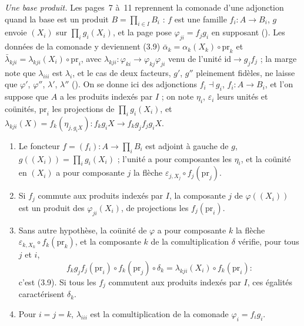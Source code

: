 \noindent\emph{Une base produit.} Les pages~7 à~11 reprennent la comonade d'une adjonction quand la base est un produit $B = \prod_{i \in I} B_i$ : $f$ est une famille $f_i : A \to B_i$, $g$ envoie $(X_i)$ sur $\prod_i g_i(X_i)$, et la page pose $\varphi_{ji} = f_j g_i$ en supposant  (). Les données de la comonade y deviennent (3.9) $\bar\alpha_k = \alpha_k(X_k) \circ \mathrm{pr}_k$ et $\bar\lambda_{kji} = \lambda_{kji}(X_i) \circ \mathrm{pr}_i$, avec $\lambda_{kji} : \varphi_{ki} \to \varphi_{kj}\varphi_{ji}$ venu de l'unité $\mathrm{id} \to g_j f_j$ ; la marge note que $\lambda_{iii}$ est $\lambda_i$, et le cas de deux facteurs, $g'$, $g''$ pleinement fidèles, ne laisse que $\varphi'$, $\varphi''$, $\lambda'$, $\lambda''$ (). On se donne ici des adjonctions $f_i \dashv g_i$, $f_i : A \to B_i$, et l'on suppose que $A$ a les produits indexés par $I$ ; on note $\eta_i$, $\varepsilon_i$ leurs unités et coünités, $\mathrm{pr}_i$ les projections de $\prod_i g_i(X_i)$, et $\lambda_{kji}(X) = f_k(\eta_{j, g_i X}) : f_k g_i X \to f_k g_j f_j g_i X$.

\begin{enonce}\leavevmode
\begin{enumerate}
\item Le foncteur $f = (f_i) : A \to \prod_i B_i$ est adjoint à gauche de $g$, $g((X_i)) = \prod_i g_i(X_i)$ ; l'unité a pour composantes les $\eta_i$, et la coünité en $(X_i)$ a pour composante $j$ la flèche $\varepsilon_{j, X_j} \circ f_j(\mathrm{pr}_j)$.
\item Si $f_j$ commute aux produits indexés par $I$, la composante $j$ de $\varphi((X_i))$ est un produit des $\varphi_{ji}(X_i)$, de projections les $f_j(\mathrm{pr}_i)$.
\item Sans autre hypothèse, la coünité de $\varphi$ a pour composante $k$ la flèche $\varepsilon_{k, X_k} \circ f_k(\mathrm{pr}_k)$, et la composante $k$ de la comultiplication $\delta$ vérifie, pour tous $j$ et $i$,
\[
f_k g_j f_j(\mathrm{pr}_i) \circ f_k(\mathrm{pr}_j) \circ \delta_k = \lambda_{kji}(X_i) \circ f_k(\mathrm{pr}_i) :
\]
c'est (3.9). Si tous les $f_j$ commutent aux produits indexés par $I$, ces égalités caractérisent $\delta_k$.
\item Pour $i = j = k$, $\lambda_{iii}$ est la comultiplication de la comonade $\varphi_i = f_i g_i$.
\end{enumerate}
\end{enonce}

